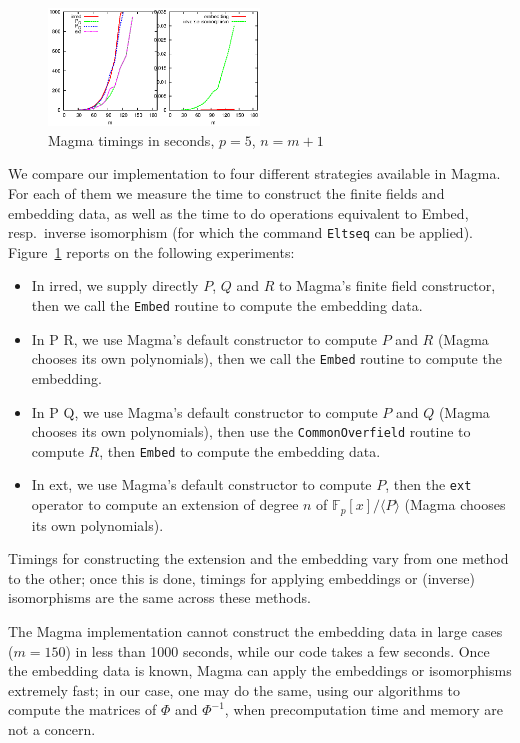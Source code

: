 \documentclass{sig-alternate}
\def\F {\ensuremath{\mathbb{F}}}
\newcounter{algo}
\newcommand{\ang}[1]{\langle#1\rangle}
\begin{document}
\begin{figure}
  \centering
  \includegraphics[width=0.5\textwidth]{magma}
  \caption{Magma timings in seconds, $p=5$, $n=m+1$}
  \label{fig:magma}
\vspace{-4ex}
\end{figure}

We compare our implementation to four different strategies available
in Magma. For each of them we measure the time to construct the finite
fields and embedding data, as well as the time to do operations
equivalent to {\sf Embed}, resp.\ inverse isomorphism (for which the
command \verb+Eltseq+ can be applied). Figure~\ref{fig:magma} reports 
on the following experiments:
\begin{itemize}
\item In {\sf irred}, we supply directly $P$, $Q$ and $R$ to Magma's
  finite field constructor, then we call the \verb+Embed+ routine to
  compute the embedding data.
\item In  {\sf P R}, we use Magma's default constructor to compute $P$
  and $R$ (Magma chooses its own polynomials), then we call the
  \verb+Embed+ routine to compute the embedding.
\item In {\sf P Q}, we use Magma's default constructor to compute $P$
  and $Q$ (Magma chooses its own polynomials), then use the
  \verb+CommonOverfield+ routine to compute $R$, then \verb+Embed+ to
  compute the embedding data.
\item In {\sf ext}, we use Magma's default constructor to compute $P$,
  then the \verb+ext+ operator to compute an extension of degree $n$
  of $\F_p[x]/\ang{P}$ (Magma chooses its own polynomials).
\end{itemize}
Timings for constructing the extension and the embedding vary from one
method to the other; once this is done, timings for applying
embeddings or (inverse) isomorphisms are the same across these
methods.

The Magma implementation cannot construct the embedding data in large
cases ($m = 150$) in less than 1000 seconds, while our code takes a
few seconds. Once the embedding data is known, Magma can apply the
embeddings or isomorphisms extremely fast; in our case, one may do the
same, using our algorithms to compute the matrices of $\Phi$ and
$\Phi^{-1}$, when precomputation time and memory are not a concern.



\scriptsize
 
\end{document}
